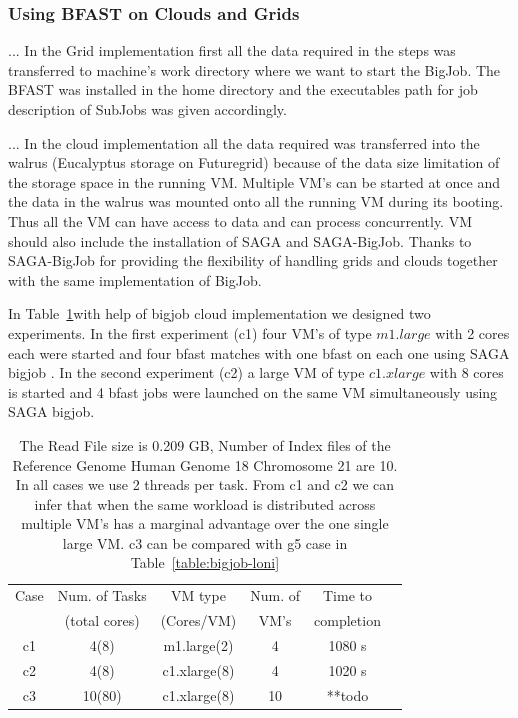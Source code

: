 \documentclass{acm_proc_article-sp}
\begin{document}
\subsubsection{Using BFAST on Clouds and Grids}

...  In the Grid implementation first all the
data required in the steps was transferred to machine's work directory
where we want to start the BigJob. The BFAST was installed in the home
directory and the executables path for job description of SubJobs was
given accordingly.

...  In the cloud implementation all the data
required was transferred into the walrus (Eucalyptus storage on Futuregrid) because of the data size
limitation of the storage space in the running VM. Multiple VM's can
be started at once and the data in the walrus was mounted onto all the
running VM during its booting. Thus all the VM can have
access to data and can process concurrently. VM should also include the installation of
SAGA and SAGA-BigJob. Thanks to SAGA-BigJob for providing the flexibility of 
handling grids and clouds together with the same implementation of BigJob.

In Table~\ref{table:cloud-VM}with help of bigjob cloud implementation we designed two
experiments. In the first experiment (c1) four  VM's of type $m1.large$ with 2 cores each were
started and four bfast matches with one bfast on each one using SAGA
bigjob . In the second experiment (c2) a large VM of type $c1.xlarge$ with 8 cores is started
and 4 bfast jobs were launched on the same VM simultaneously using
SAGA bigjob.

 \begin{table}
 \small
 \begin{tabular}{|c|c|c|c|c|c|} 
 \hline 
 Case& Num. of Tasks &  VM type &  Num. of  &  Time to  \\ 
      & (total cores) & (Cores/VM)  &VM's & completion\\ 
\hline
c1 &  4(8) & m1.large(2) & 4 & 1080 s \\
c2 & 4(8) & c1.xlarge(8) & 4 &1020 s \\
c3 & 10(80) & c1.xlarge(8) & 10 & **todo \\
 \hline 
 \end{tabular}
 \label{table:cloud-VM} 
 
 
 \caption{ The Read File size is  0.209 GB, Number of Index 
 files of the Reference Genome Human Genome 18 Chromosome 21 are 10. 
 In all cases we use 2 threads per task. From c1 and c2 we can infer that when the same workload is distributed 
across multiple VM's has a marginal advantage over the one single large VM. c3 can be compared with g5 case in Table~\ref{table:bigjob-loni}}


\end{table}
\end{document}

